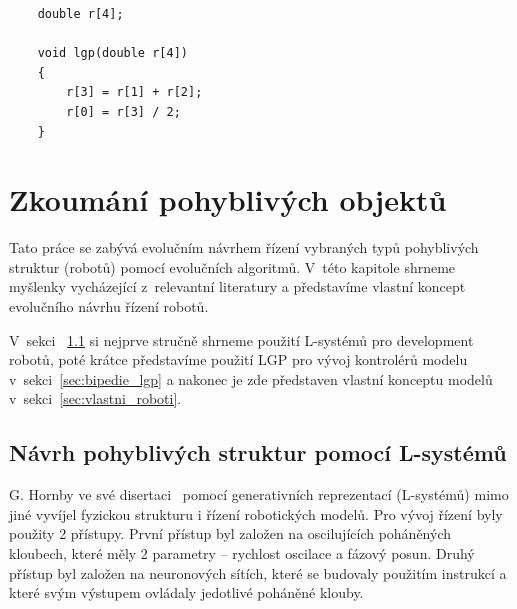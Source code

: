 
\begin{lstlisting}
    double r[4];

    void lgp(double r[4])
    {
        r[3] = r[1] + r[2];
        r[0] = r[3] / 2;
    }
\end{lstlisting}


\chapter{Zkoumání pohyblivých objektů}
\label{chap:zkoumani_pohyblivych_objektu}

Tato práce se zabývá evolučním návrhem řízení vybraných typů pohyblivých struktur (robotů) pomocí evolučních algoritmů.
V~této kapitole shrneme myšlenky vycházející z~relevantní literatury a představíme vlastní koncept evolučního návrhu řízení robotů.

V~sekci ~\ref{sec:l_systemy} si nejprve stručně shrneme použití L-systémů pro development robotů, poté krátce představíme použití LGP pro vývoj kontrolérů modelu v~sekci~\ref{sec:bipedie_lgp} a nakonec je zde představen vlastní konceptu modelů v~sekci~\ref{sec:vlastni_roboti}.

\section{Návrh pohyblivých struktur pomocí L-systémů}
\label{sec:l_systemy}

G. Hornby ve své disertaci~\cite{Hornby2003} pomocí generativních reprezentací (L-systémů) mimo jiné vyvíjel fyzickou strukturu i řízení robotických modelů.
Pro vývoj řízení byly použity 2 přístupy.
První přístup byl založen na oscilujících poháněných kloubech, které měly 2 parametry -- rychlost oscilace a fázový posun.
Druhý přístup byl založen na neuronových sítích, které se budovaly použitím instrukcí a které svým výstupem ovládaly jedotlivé poháněné klouby.

